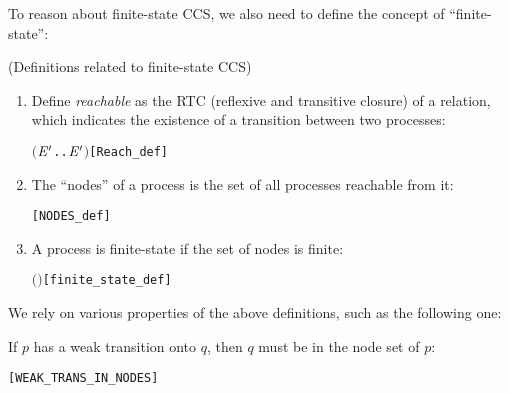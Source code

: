 To reason about finite-state CCS, we also need to define the concept
of ``finite-state'':
\begin{definition}{(Definitions related to finite-state CCS)}
\begin{enumerate}
\item Define \emph{reachable} as the RTC (reflexive and transitive
  closure)
 of a relation, which
  indicates the existence of a transition between two processes:
\begin{alltt}
 \HOLTokenDefEquality{} \ensuremath{(}\HOLTokenLambda{} \ensuremath{\HOLBoundVar{E}\sp{\prime}}. \HOLSymConst{\HOLTokenExists{}}.  \HOLTokenTransBegin{}\HOLTokenTransEnd \ensuremath{\HOLBoundVar{E}\sp{\prime}}\ensuremath{)}\HOLSymConst{\HOLTokenSupStar{}}\hfill[Reach_def]
\end{alltt}
\item The ``nodes'' of a process is the set of all processes reachable
  from it:
\begin{alltt}
  \HOLTokenDefEquality{} \HOLTokenLeftbrace{} \HOLTokenBar{}   \HOLTokenRightbrace{}\hfill[NODES_def]
\end{alltt}
\item A process is finite-state if the set of nodes is finite:
\begin{alltt}
  \HOLTokenDefEquality{}  \ensuremath{(} \ensuremath{)}\hfill[finite_state_def]
\end{alltt}
\end{enumerate}
\end{definition}
We rely
on  various 
 properties of the above definitions, such as the following one:
\begin{proposition}
If $p$ has a weak transition onto $q$, then $q$ must be in the node set of $p$:
\begin{alltt}
\HOLTokenTurnstile{}  \HOLTokenWeakTransBegin{}\HOLTokenWeakTransEnd {} \HOLSymConst{\HOLTokenImp{}}  \HOLSymConst{\HOLTokenIn{}}  \hfill[WEAK_TRANS_IN_NODES]
\end{alltt}
\end{proposition}


